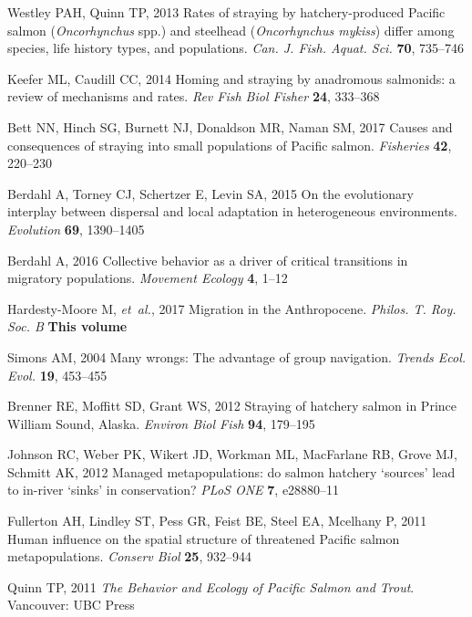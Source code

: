 \documentclass{revtex4}
\begin{document}
\begin{thebibliography}{10}
Westley PAH, Quinn TP, 2013 {Rates of straying by hatchery-produced Pacific
  salmon (\emph{Oncorhynchus} spp.) and steelhead (\emph{Oncorhynchus mykiss})
  differ among species, life history types, and populations}.
\newblock \emph{Can. J. Fish. Aquat. Sci.} \textbf{70}, 735--746

Keefer ML, Caudill CC, 2014 {Homing and straying by anadromous salmonids: a
  review of mechanisms and rates}.
\newblock \emph{Rev Fish Biol Fisher} \textbf{24}, 333--368

Bett NN, Hinch SG, Burnett NJ, Donaldson MR, Naman SM, 2017 {Causes and
  consequences of straying into small populations of Pacific salmon}.
\newblock \emph{Fisheries} \textbf{42}, 220--230

Berdahl A, Torney CJ, Schertzer E, Levin SA, 2015 {On the evolutionary
  interplay between dispersal and local adaptation in heterogeneous
  environments}.
\newblock \emph{Evolution} \textbf{69}, 1390--1405

Berdahl A, 2016 {Collective behavior as a driver of critical transitions in
  migratory populations}.
\newblock \emph{Movement Ecology} \textbf{4}, 1--12

Hardesty-Moore M, \emph{et~al.}, 2017 {Migration in the Anthropocene}.
\newblock \emph{Philos. T. Roy. Soc. B} \textbf{This volume}

Simons AM, 2004 {Many wrongs: The advantage of group navigation}.
\newblock \emph{Trends Ecol. Evol.} \textbf{19}, 453--455

Brenner RE, Moffitt SD, Grant WS, 2012 {Straying of hatchery salmon in Prince
  William Sound, Alaska}.
\newblock \emph{Environ Biol Fish} \textbf{94}, 179--195

Johnson RC, Weber PK, Wikert JD, Workman ML, MacFarlane RB, Grove MJ, Schmitt
  AK, 2012 {Managed metapopulations: do salmon hatchery
  {\textquoteleft}sources{\textquoteright} lead to in-river
  {\textquoteleft}sinks{\textquoteright} in conservation?}
\newblock \emph{PLoS ONE} \textbf{7}, e28880--11

Fullerton AH, Lindley ST, Pess GR, Feist BE, Steel EA, Mcelhany P, 2011 {Human
  influence on the spatial structure of threatened Pacific salmon
  metapopulations}.
\newblock \emph{Conserv Biol} \textbf{25}, 932--944

Quinn TP, 2011 \emph{{The Behavior and Ecology of Pacific Salmon and Trout}}.
\newblock Vancouver: UBC Press


\end{thebibliography}
\end{document}
